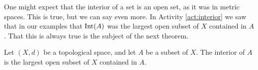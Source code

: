 \begin{comment}

\ActivitySolution

\ba
\item If $x \in (-\infty,0)$, then $B(x,|x|) \subseteq A$. If $x \in (1,2)$ and $r = \min\{x-1, 2-x\}$, then $B(x,r) \subseteq A$. So every point in $(-\infty,0) \cup (1,2)$ is an interior point of $A$. For any $\epsilon > 0$, the ball $B(2,\epsilon)$ contains points larger than $2$ and the ball $B(3,\epsilon)$ contains points larger than $3$. So neither $2$ nor $3$ is an interior point of $A$. This makes $\Int(A) = (-\infty,0) \cup (1,2)$. We also see that $\Int(A)$ is the largest open subset of $X$ contained in $A$.    

\item Since every subset of $\R$ is an open set, every set is a neighborhood of each of its points. That and the fact that $\Int(A) \subseteq A$ by definition allows us to conclude that $\Int(A) = A$. Since every set is open, the largest open set in $\R$ contained in $A$ is also $A$. 

\item Recall that a set $O$ is open in the finite complement topology if $\R \setminus O$ is finite. Since $\R \setminus A$ is not finite, no subset of $A$ is open and so no subset of $A$ can be a neighborhood of each of its points. It follows that $\Int(A) = \emptyset$. By the same reasoning, $A$ contains no open subset of $\R$, so the largest open subset of $\R$ contained in $A$ is $\emptyset$. 

\item Since $\{c\} \subseteq A$ and $\{d\} \subseteq A$, we see that $c$ and $d$ are interior points of $A$. However, there is no open subset of $A$ that contains $b$, so $b$ is not an interior point of $A$. It follows that $\Int(A) = \{c,d\}$, which is also the largest open subset of $X$ contained in $A$. 

\ea

\end{comment}


One might expect that the interior of a set is an open set, as it was in metric spaces. This is true, but we can say even more. In Activity \ref{act:interior} we saw that in our examples that $\text{Int}(A)$ was the largest open subset of $X$ contained in $A$. That this is always true is the subject of the next theorem. 

\begin{theorem} \label{thm:Interior} Let $(X,d)$ be a topological space, and let $A$ be a subset of $X$. The interior of $A$ is the largest open subset of $X$ contained in $A$.  
\end{theorem}

